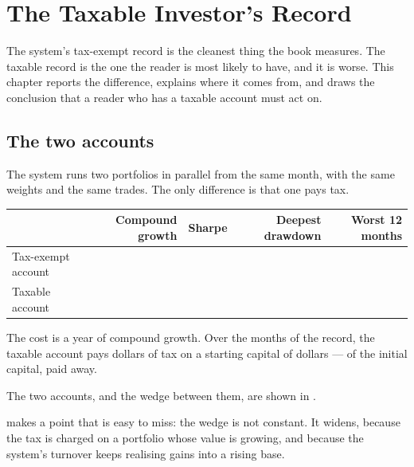 
\chapter{The Taxable Investor's Record}
\label{ch:taxable-record}

The system's tax-exempt record is the cleanest thing the book measures. The
taxable record is the one the reader is most likely to have, and it is
worse. This chapter reports the difference, explains where it comes from,
and draws the conclusion that a reader who has a taxable account must act
on.

\section{The two accounts}

The system runs two portfolios in parallel from the same month, with the
same weights and the same trades. The only difference is that one pays
tax.

\begin{center}
\begin{tabular}{@{}P{1.70in}rrrr@{}}
\toprule
 & Compound growth & Sharpe & Deepest drawdown & Worst 12 months \\
\midrule
Tax-exempt account & \numFullCAGR{} & \numFullSharpe{} & \numFullDD{} & \numFullWorstYear{} \\
Taxable account    & \numTaxCAGR{} & \numTaxSharpe{} & \numTaxDD{} & \numTaxWorstYear{} \\
\bottomrule
\end{tabular}
\end{center}

The cost is \numTaxPenalty{} a year of compound growth. Over the
\numRecordMonths{} months of the record, the taxable account pays
\numTaxTotal{} dollars of tax on a starting capital of \numInitialCapital{}
dollars --- \numTaxFraction{} of the initial capital, paid away.

The two accounts, and the wedge between them, are shown in .

 makes a point that is easy to miss: the wedge is
not constant. It widens, because the tax is charged on a portfolio whose
value is growing, and because the system's turnover keeps realising gains
into a rising base.


